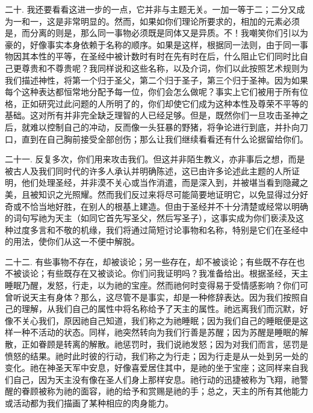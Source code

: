 二十. 我还要看看这进一步的一点，它并非与主题无关。一加一等于二；二分又成为一和一，这是非常明显的。然而，如果如你们理论所要求的，相加的元素必须是，而分离的则是，那么同一事物必须既是同体又是异质。不！我嘲笑你们引以为豪的，好像事实本身依赖于名称的顺序。如果是这样，根据同一法则，由于同一事物因其本性的平等，在圣经中被计数时有时在先有时在后，什么阻止它们同时比自己更尊贵和不尊贵呢？我同样说和这些名称，以及介词，你们以此按照艺术规则为我们描述神性，将第一个归于圣父，第二个归于圣子，第三个归于圣神。因为如果每个这种表达都恒常地分配予每一位，你们会怎么做呢？事实上它们被用于所有位格，正如研究过此问题的人所明了的，你们却使它们成为这种本性及尊荣不平等的基础。这对所有并非完全缺乏理智的人已经足够。但是，既然你们一旦攻击圣神之后，就难以控制自己的冲动，反而像一头狂暴的野猪，将争论进行到底，并扑向刀口，直到在自己胸前接受全部创伤；那么让我们继续看看还有什么论据留给你们。\par

二十一. 反复多次，你们用来攻击我们。但这并非陌生教义，亦非事后之想，而是被古人及我们同时代的许多人承认并明确陈述，这已由许多论述此主题的人所证明，他们处理圣经，并非漠不关心或当作消遣，而是深入到，并被堪当看到隐藏之美，且被知识之光照耀。然而我们反过来将尽可能简要地证明它，以免显得过分好奇或不恰当地好胜，在别人的根基上建造。但由于圣经并不十分清楚或经常以明确的词句写祂为天主（如同它首先写圣父，然后写圣子），这事实成为你们亵渎及这种过度多言和不敬的机缘，我们将通过简短讨论事物和名称，特别是它们在圣经中的用法，使你们从这一不便中解脱。\par

二十二. 有些事物不存在，却被谈论；另一些存在，却不被谈论；有些既不存在也不被谈论；有些既存在又被谈论。你们问我证明吗？我准备给出。根据圣经，天主睡眠乃醒，发怒，行走，以为祂的宝座。然而祂何时变得易于受情感影响？你们可曾听说天主有身体？那么，这尽管不是事实，却是一种修辞表达。因为我们按照自己的理解，从我们自己的属性中将名称给予了天主的属性。祂远离我们而沉默，好像不关心我们，原因祂自己知道，我们称之为祂睡眠；因为我们自己的睡眠便是这样一种不活动的状态。同样，祂突然转向为我们行善是苏醒；因为苏醒是睡眠的解散，正如眷顾是转离的解散。祂惩罚时，我们说祂发怒；因为对我们而言，惩罚是愤怒的结果。祂时此时彼的行动，我们称之为行走；因为行走是从一处到另一处的变化。祂在神圣天军中安息，好像喜爱居住其中，是祂的坐于宝座；这同样来自我们自己，因为天主没有像在圣人们身上那样安息。祂行动的迅捷被称为飞翔，祂警醒的眷顾被称为祂的面容，祂的给予和赏赐是祂的手；总之，天主的所有其他能力或活动都为我们描画了某种相应的肉身能力。\par

